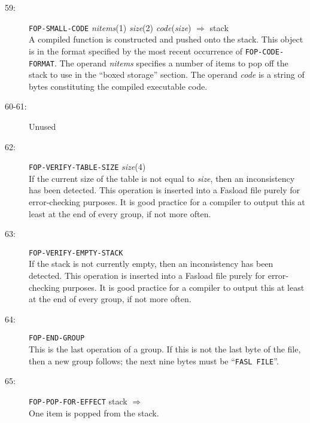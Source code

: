 \begin{description}
\item[59:] \hspace{2em} {\tt FOP-SMALL-CODE} \hspace{2em} {\it nitems}(1) \hspace{2em} {\it size}(2) \hspace{2em}
{\it code}({\it size}) \hspace{2em} $\Rightarrow$ \hspace{2em} stack \\
A compiled function is constructed and pushed onto the stack.
This object is in the format specified by the most recent
occurrence of {\tt FOP-CODE-FORMAT}.
The operand {\it nitems} specifies a number of items to pop off
the stack to use in the ``boxed storage'' section.  The operand {\it code}
is a string of bytes constituting the compiled executable code.

\item[60-61:] Unused

\item[62:] \hspace{2em} {\tt FOP-VERIFY-TABLE-SIZE} \hspace{2em} {\it size}(4) \\
If the current size of the table is not equal to {\it size},
then an inconsistency has been detected.  This operation
is inserted into a Fasload file purely for error-checking purposes.
It is good practice for a compiler to output this at least at the
end of every group, if not more often.

\item[63:] \hspace{2em} {\tt FOP-VERIFY-EMPTY-STACK} \\
If the stack is not currently empty,
then an inconsistency has been detected.  This operation
is inserted into a Fasload file purely for error-checking purposes.
It is good practice for a compiler to output this at least at the
end of every group, if not more often.

\item[64:] \hspace{2em} {\tt FOP-END-GROUP} \\
This is the last operation of a group.	If this is not the
last byte of the file, then a new group follows; the next
nine bytes must be ``{\tt FASL FILE}''.

\item[65:] \hspace{2em} {\tt FOP-POP-FOR-EFFECT} \hspace{2em} stack \hspace{2em} $\Rightarrow$ \hspace{2em} \\
One item is popped from the stack.


\end{description}

